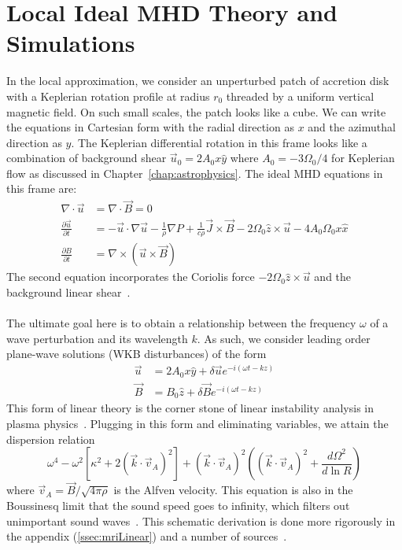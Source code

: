 \section{Local Ideal MHD Theory and Simulations} \label{sec:localideal}
In the local approximation, we consider an unperturbed patch of accretion disk with a Keplerian rotation profile at radius $r_0$ threaded by a uniform vertical magnetic field. On such small scales, the patch looks like a cube. We can write the equations in Cartesian form with the radial direction as $x$ and the azimuthal direction as $y$. The Keplerian differential rotation in this frame looks like a combination of background shear $\vec u_0=2A_0x\hat y$ where $A_0=-3\Omega_0/4$ for Keplerian flow as discussed in Chapter~\ref{chap:astrophysics}. The ideal MHD equations in this frame are:
\begin{align}
  \nabla\cdot\vec u&=\nabla\cdot\vec B=0\\
  \frac{\partial\vec u}{\partial t}&=-\vec u\cdot\nabla\vec u-\frac1\rho\nabla P+\frac{1}{c\rho}\vec J\times\vec B-2\Omega_0\hat z\times\vec u-4A_0\Omega_0x\hat x\\
  \frac{\partial B}{\partial t}&=\nabla\times\left(\vec u\times\vec B\right)
\end{align}
The second equation incorporates the Coriolis force $-2\Omega_0\hat z\times\vec u$ and the background linear shear~\cite{AST521HW4}. \\
\\
The ultimate goal here is to obtain a relationship between the frequency $\omega$ of a wave perturbation and its wavelength $k$. As such, we consider leading order plane-wave solutions (WKB disturbances) of the form
\begin{align}
  \vec u&=2A_0x\hat y+\delta\vec ue^{-i(\omega t-kz)}\\
  \vec B&=B_0\hat z+\delta\vec Be^{-i(\omega t-kz)}
\end{align}
This form of linear theory is the corner stone of linear instability analysis in plasma physics~\cite{AST521HW4,BH1998,BH1991a,Quataert2008}. Plugging in this form and eliminating variables, we attain the dispersion relation
\begin{equation}
  \omega^4-\omega^2[\kappa^2+2(\vec k\cdot \vec v_A)^2]+(\vec k\cdot\vec v_A)^2\left((\vec k\cdot \vec v_A)^2+\frac{d\Omega^2}{d\ln R}\right)\label{eq:idealdispersion}
\end{equation}
where $\vec v_A=\vec B/\sqrt{4\pi\rho}$ is the Alfven velocity. This equation is also in the Boussinesq limit that the sound speed goes to infinity, which filters out unimportant sound waves~\cite{BH1998,KunzBoussinesq}. This schematic derivation is done more rigorously in the appendix (\ref{ssec:mriLinear}) and a number of sources~\cite{BH1998, BH1991a,BH1991b,BH1991c}.

